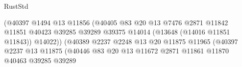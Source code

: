 \begin{lexlean}{RustStd}
\begin{coremodule}
                                                      (@40397
                                                        @1494
                                                        @13
                                                        @11856
                                                        (@40405
                                                          @83
                                                          @20
                                                          @13
                                                          @7476
                                                          @2871
                                                          @11842
                                                          @11851
                                                          @40423
                                                          @39285
                                                          @39289
                                                          @39375
                                                          @14014
                                                          (@13648 (@14016 @11851 @11843))
                                                          @14022))
                                                      (@40389
                                                        @2237
                                                        @2248
                                                        @13
                                                        @20
                                                        @11875
                                                        @11965
                                                        (@40397
                                                          @2237
                                                          @13
                                                          @11875
                                                          (@40446
                                                            @83
                                                            @20
                                                            @13
                                                            @11672
                                                            @2871
                                                            @11861
                                                            @11870
                                                            @40463
                                                            @39285
                                                            @39289

\end{coremodule}
\end{lexlean}
